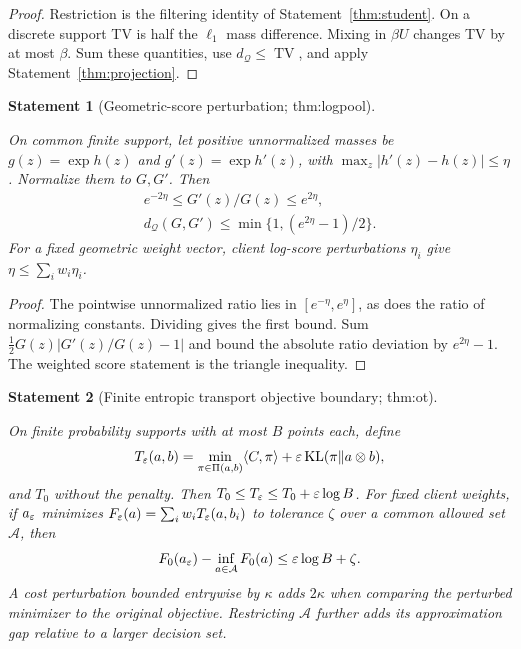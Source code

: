 \documentclass[11pt]{article}
\newtheorem{statement}{Statement}
\newcommand{\Q}{\mathcal Q}\newcommand{\Z}{\mathcal Z}\newcommand{\W}{\mathcal W}
\newcommand{\TV}{\operatorname{TV}}\newcommand{\KL}{\operatorname{KL}}
\begin{document}
\begin{proof}
Restriction is the filtering identity of Statement~\ref{thm:student}. On a discrete support TV is half the $\ell_1$ mass difference. Mixing in $\beta U$ changes TV by at most $\beta$. Sum these quantities, use $d_\Q\le\TV$, and apply Statement~\ref{thm:projection}.
\end{proof}

\begin{statement}[Geometric-score perturbation; thm:logpool]\label{thm:logpool}

On common finite support, let positive unnormalized masses be $g(z)=\exp h(z)$ and $g'(z)=\exp h'(z)$, with $\max_z|h'(z)-h(z)|\le\eta$. Normalize them to $G,G'$. Then
\begin{equation}
\begin{gathered}
e^{-2\eta}\le G'(z)/G(z)\le e^{2\eta},\\
d_\Q(G,G')\le\min\{1,(e^{2\eta}-1)/2\}.
\end{gathered}
\end{equation}
For a fixed geometric weight vector, client log-score perturbations $\eta_i$ give $\eta\le\sum_iw_i\eta_i$.

\end{statement}

\begin{proof}
The pointwise unnormalized ratio lies in $[e^{-\eta},e^\eta]$, as does the ratio of normalizing constants. Dividing gives the first bound. Sum $\frac12G(z)|G'(z)/G(z)-1|$ and bound the absolute ratio deviation by $e^{2\eta}-1$. The weighted score statement is the triangle inequality.
\end{proof}

\begin{statement}[Finite entropic transport objective boundary; thm:ot]\label{thm:ot}

On finite probability supports with at most $B$ points each, define
\begin{equation}
T_\eps(a,b)=\min_{\pi\in\Pi(a,b)}
\langle C,\pi\rangle+\eps\KL(\pi\|a\otimes b),
\end{equation}
and $T_0$ without the penalty. Then $T_0\le T_\varepsilon\le T_0+\varepsilon\log B$. For fixed client weights, if $a_\varepsilon$ minimizes $F_\varepsilon(a)=\sum_iw_iT_\varepsilon(a,b_i)$ to tolerance $\zeta$ over a common allowed set $\mathcal A$, then
\begin{equation}\label{eq:ot}
F_0(a_\varepsilon)-\inf_{a\in\mathcal A}F_0(a)
\le\varepsilon\log B+\zeta.
\end{equation}
A cost perturbation bounded entrywise by $\kappa$ adds $2\kappa$ when comparing the perturbed minimizer to the original objective. Restricting $\mathcal A$ further adds its approximation gap relative to a larger decision set.

\end{statement}
\end{document}
